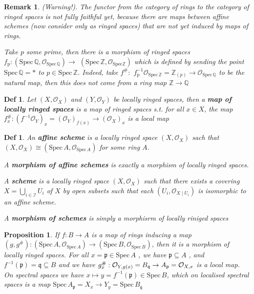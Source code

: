 \documentclass{article}
\newtheorem{definition}[theorem]{Def}
\newtheorem{proposition}[theorem]{Proposition}
\newtheorem{remark}[theorem]{Remark}
\begin{document}
\begin{remark}(Warning!). The functor from the category of rings to the category of ringed spaces
is not fully faithful yet, because there are maps between affine schemes (now consider only as ringed
spaces) that are not yet induced by maps of rings.

Take $p$ some prime, then there is a morphism of ringed spaces $f_{\mathrm{p}}:(\mathrm{Spec}\,\mathbb{Q},{\mathcal{O}}_{\mathrm{Spec}\,\mathbb{Q}})\to$  $({\mathrm{Spec}}\,\mathbb{Z},{\mathcal{O}}_{\mathrm{Spec}\mathbb{Z}})$ which is defined by sending the point $\mathrm{Spec}\,\mathbb{Q}={\ast}$ to $p\in{\mathrm{Spec}}\,\mathbb{Z}$. Indeed, take $f^{\#} :$  $f_{\mathrm{p}}^{-1}{\mathcal{O}}_{\mathrm{Spec}\,\mathbb{Z}}=\mathbb Z_{(p)}
\to
{\mathcal{O}}_{\mathrm{Spec}\,\mathbb{Q}}$ to be the natural map, then this does not come from a ring map $\mathbb{Z}\to\mathbb{Q}$ 
\end{remark}

\begin{definition}
    Let $(X,{\mathcal{O}}_{X})$ and $(Y,{\mathcal{O}}_{Y})$ be locally ringed spaces, then a \textbf{map of locally ringed spaces} is a map of ringed spaces s.t. for all $x\in X$, the map $f^{\#}_x:(f^{-1}\mathcal O_{Y})_x=(\mathcal O_Y)_{f(x)}\to(\mathcal O_X)_x$ is a local map
\end{definition}

\begin{definition}
    An \textbf{affine scheme} is a locally ringed space $(X,{\mathcal{O}}_{X})$ sach that $(X,{\mathcal O}_{X})\cong({\mathrm{Spec}}\,A,{\mathcal O}_{{\mathrm{Spec}}\,A})$ for some ring $A$. 
    
    A \textbf{morphism of affine schemes} is exactly a morphism of locally ringed spaces. 
    
    A \textbf{scheme} is a locally ringed space $(X,{\mathcal{O}}_{X})$ such that there exists a covering $X=\bigcup_{i\in\mathcal{I}}U_{i}$ of $X$ by open subsets such that each $\left(U_{i},{\mathcal{O}}_{X\mid U_{i}}\right)$ is isomorphic to an affine scheme. 
    
    A \textbf{morphism of schemes} is simply a morphisrm of locally riniged spaces
\end{definition}

\begin{proposition}
    If $f:{B} \rightarrow{A}$ is a map of rings inducing a map $(g,g^{\#}):({\mathrm{Spec}}\,A,{\mathcal{O}}_{\mathrm{Spec}\,A})\to({\mathrm{Spec}}\,B,{\mathcal{O}}_{\mathrm{Spec}\,B})$, then it is a morphism of locally ringed spaces. For all $x=\mathfrak{p} \in\mathrm{Spec}\,A$ , we have ${\mathfrak{p}}\subseteq A$ , and $f^{-1}({\mathfrak{p}})={\mathfrak{q}}\subseteq B$ and we have $g_{x}^{\#}:{\cal O}_{Y,g(x)}={ B}_{\mathfrak q} \rightarrow{ A}_{\mathfrak p}={\cal O}_{X,x}$ is a local map. On spectral spaces we have $x\mapsto y=f^{-1}({\mathfrak{p}})\in{\mathrm{Spec}}\,B$, which on localised spectral spaces is a map $\mathrm{Spec}\,A_{\mathfrak{p}}=X_{x} \rightarrow Y_{y}=\mathrm{Spec}\,B_{\mathfrak{q}}$
\end{proposition}
\end{document}
